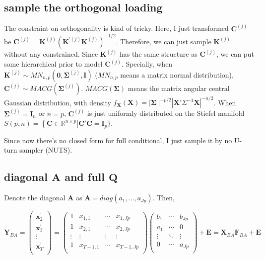 \documentclass[]{article}
\begin{document}
\subsection{sample the orthogonal loading}
The constraint on orthogonality is kind of tricky. Here, I just transformed \(\mathbf{C}^{(j)}\) be
\(\mathbf{C}^{(j)} = \mathbf{K}^{(j)}\left( \mathbf{K}^{'(j)}\mathbf{K}^{(j)} \right)^{- 1/2}\). Therefore,
we can just sample \(\mathbf{K}^{(j)}\) without any constrained. Since
\(\mathbf{K}^{(j)}\) has the same structure as \(\mathbf{C}^{(j)}\), we can put some
hierarchical prior to model \(\mathbf{C}^{(j)}\). Specially, when
\(\mathbf{K}^{(j)} \sim MN_{n,p}(\mathbf{0},\bm{\Sigma}^{(j)},\mathbf{I})\) (\(MN_{n,p}\) means a matrix
normal distribution), \(\mathbf{C}^{(j)} \sim MACG(\bm{\Sigma}^{(j)})\).
\(MACG(\bm{\Sigma})\) means the matrix angular central Gaussian distribution,
with density
\(f_{\mathbf{X}}(\mathbf{X}) = |\bm{\Sigma}\left. \  \right|^{- p/2}{|\mathbf{X}'\Sigma^{- 1}\mathbf{X}|}^{- n/2}\).
When \(\bm{\Sigma}^{(j)} = \mathbf{I}_{n}\) or \(n = p\), \(\mathbf{C}^{(j)}\) is just
uniformly distributed on the Stiefel manifold
\(S(p,n) = \left\{ \mathbf{C} \in \mathbb{R}^{n \times p} \right|\mathbf{C}'\mathbf{C} = \mathbf{I}_{p}\}\).

Since now there's no closed form for full conditional, I just sample it by no U-turn sampler (NUTS).

\subsection{diagonal $\mathbf{A}$ and full $\mathbf{Q}$}
Denote the diagonal \(\mathbf{A}\) as \(\mathbf{A} = diag(a_{1},\ldots,a_{Jp})\). Then,

\[\mathbf{Y}_{BA} = \begin{pmatrix}
	\mathbf{x}_{2}^{'} \\
	\mathbf{x}_{3}^{'} \\
	\vdots \\
	\mathbf{x}_{T}^{'} \\
\end{pmatrix} = \begin{pmatrix}
	1 & x_{1,1} & \cdots & x_{1,Jp} \\
	1 & x_{2,1} & \cdots & x_{2,Jp} \\
	\vdots & \vdots & \vdots & \vdots \\
	1 & x_{T - 1,1} & \cdots & x_{T - 1,Jp} \\
\end{pmatrix}\begin{pmatrix}
	b_{1} & \cdots & b_{Jp} \\
	a_{1} & \cdots & 0 \\
	\vdots & \ddots & \vdots \\
	0 & \cdots & a_{Jp} \\
\end{pmatrix} + \mathbf{E} = \mathbf{X}_{BA}\mathbf{F}_{BA} + \mathbf{E}\]
\end{document}
